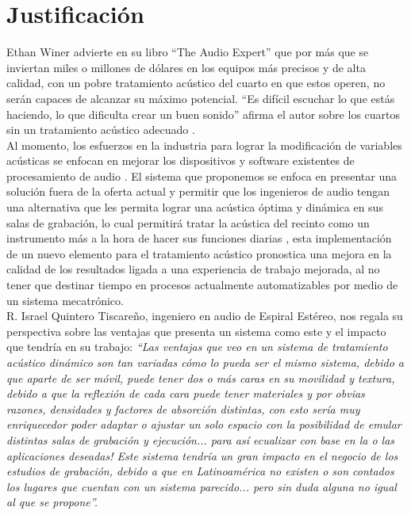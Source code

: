 \section*{Justificación}
Ethan Winer advierte en su libro “The Audio Expert” que por más que se inviertan miles o millones de dólares en los equipos más precisos y de alta calidad, con un pobre tratamiento acústico del cuarto en que estos operen, no serán capaces de alcanzar su máximo potencial. “Es difícil escuchar lo que estás haciendo, lo que dificulta crear un buen sonido” afirma el autor sobre los cuartos sin un tratamiento acústico adecuado \cite{Winer2017}.
\\
Al momento, los esfuerzos en la industria para lograr la modificación de variables acústicas se enfocan en mejorar los dispositivos y software existentes de procesamiento de audio \cite{Weir2012}. El sistema que proponemos se enfoca en presentar una solución fuera de la oferta actual y permitir que los ingenieros de audio tengan una alternativa que les permita lograr una acústica óptima y dinámica en sus salas de grabación, lo cual permitirá tratar la acústica del recinto como un instrumento más a la hora de hacer sus funciones diarias \cite{AudioHunt}, esta implementación de un nuevo elemento para el tratamiento acústico pronostica una mejora en la calidad de los resultados ligada a una experiencia de trabajo mejorada, al no tener que destinar tiempo en procesos actualmente automatizables por medio de un sistema mecatrónico.
\\
R. Israel Quintero Tiscareño, ingeniero en audio de Espiral Estéreo, nos regala su perspectiva sobre las ventajas que presenta un sistema como este y el impacto que tendría en su trabajo: \textit{“Las ventajas que veo en un sistema de tratamiento acústico dinámico son tan variadas cómo lo pueda ser el mismo sistema, debido a que aparte de ser móvil, puede tener dos o más caras en su movilidad y textura, debido a que la reflexión de cada cara puede tener materiales y por obvias razones, densidades y factores de absorción distintas, con esto sería muy enriquecedor poder adaptar o ajustar un solo espacio con la posibilidad de emular distintas salas de grabación y ejecución... para así ecualizar con base en la o las aplicaciones deseadas! Este sistema tendría un gran impacto en el negocio de los estudios de grabación, debido a que en Latinoamérica no existen o son contados los lugares que cuentan con un sistema parecido... pero sin duda alguna no igual al que se propone”.}
\\
